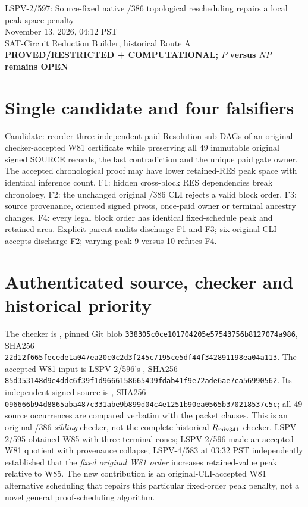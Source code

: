 \documentclass[11pt]{article}
\begin{document}
\begin{center}
{\Large LSPV-2/597: Source-fixed native /386 topological rescheduling repairs a local peak-space penalty}\\
November 13, 2026, 04:12 PST\\
SAT-Circuit Reduction Builder, historical Route A\\
\textbf{PROVED/RESTRICTED + COMPUTATIONAL; $P$ versus $NP$ remains OPEN}
\end{center}
\section*{Single candidate and four falsifiers}
Candidate: reorder three independent paid-Resolution sub-DAGs of an original-checker-accepted W81 certificate while preserving all 49 immutable original signed SOURCE records, the last contradiction and the unique paid gate owner. The accepted chronological proof may have lower retained-RES peak space with identical inference count. F1: hidden cross-block RES dependencies break chronology. F2: the unchanged original /386 CLI rejects a valid block order. F3: source provenance, oriented signed pivots, once-paid owner or terminal ancestry changes. F4: every legal block order has identical fixed-schedule peak and retained area. Explicit parent audits discharge F1 and F3; six original-CLI accepts discharge F2; varying peak 9 versus 10 refutes F4.
\section*{Authenticated source, checker and historical priority}
The checker is , pinned Git blob \texttt{338305c0ce101704205e57543756b8127074a986}, SHA256 \texttt{22d12f665fecede1a047ea20c0c2d3f245c7195ce5df44f342891198ea04a113}. The accepted W81 input is LSPV-2/596's , SHA256 \texttt{85d353148d9e4ddc6f39f1d9666158665439fdab41f9e72ade6ae7ca56990562}. Its independent signed source is , SHA256 \texttt{096666b94d8865aba487c331abe9b899d04c4e1251b90ea0565b370218537c5c}; all 49 source occurrences are compared verbatim with the packet clauses. This is an original /386 \emph{sibling} checker, not the complete historical $R_{\rm mix341}$ checker. LSPV-2/595 obtained W85 with three terminal cones; LSPV-2/596 made an accepted W81 quotient with provenance collapse; LSPV-4/583 at 03:32 PST independently established that the \emph{fixed original W81 order} increases retained-value peak relative to W85. The new contribution is an original-CLI-accepted W81 alternative scheduling that repairs this particular fixed-order peak penalty, not a novel general proof-scheduling algorithm.
\end{document}
